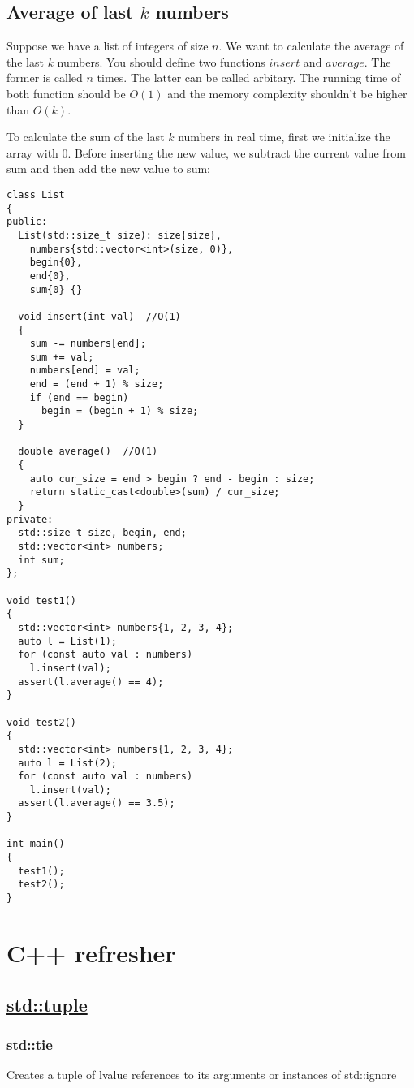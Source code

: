\documentclass{book}
\begin{document}
	\section{Average of last $k$ numbers}
	Suppose we have a list of integers of size $n$. We want to calculate the average of the last $k$ numbers. You should define two functions $insert$ and $average$. The former is called $n$ times. The latter can be called arbitary. The running time of both function should be $O(1)$ and the memory complexity shouldn't be higher than $O(k)$.
	\par To calculate the sum of the last $k$ numbers in real time, first we initialize the array with 0. Before inserting the new value, we subtract the current value from sum and then add the new value to sum:
	\begin{lstlisting}
class List
{
public:
  List(std::size_t size): size{size},
    numbers{std::vector<int>(size, 0)},
    begin{0},
    end{0},
    sum{0} {}

  void insert(int val)  //O(1)
  {
    sum -= numbers[end];
    sum += val;
    numbers[end] = val;
    end = (end + 1) % size;
    if (end == begin)
      begin = (begin + 1) % size;
  }

  double average()  //O(1)
  {
    auto cur_size = end > begin ? end - begin : size;
    return static_cast<double>(sum) / cur_size;
  }
private:
  std::size_t size, begin, end;
  std::vector<int> numbers;
  int sum;
};

void test1()
{
  std::vector<int> numbers{1, 2, 3, 4};
  auto l = List(1);
  for (const auto val : numbers)
    l.insert(val);
  assert(l.average() == 4);
}

void test2()
{
  std::vector<int> numbers{1, 2, 3, 4};
  auto l = List(2);
  for (const auto val : numbers)
    l.insert(val);
  assert(l.average() == 3.5);
}

int main()
{
  test1();
  test2();
}
	\end{lstlisting}
	\appendix
	\chapter{C++ refresher}
	\section{\href{https://en.cppreference.com/w/cpp/utility/tuple}{std::tuple}}
	
	\subsection{\href{https://en.cppreference.com/w/cpp/utility/tuple/tie}{std::tie}}
	Creates a tuple of lvalue references to its arguments or instances of std::ignore
\end{document}
